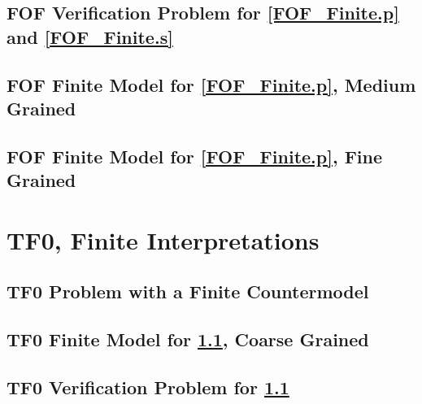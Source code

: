 \documentclass{easychair}
\begin{document}
\newpage
\subsection{FOF Verification Problem for \ref{FOF_Finite.p} and \ref{FOF_Finite.s}}
\label{FOF_Finite.s.p}
\begin{small}

\end{small}

\newpage
\subsection{FOF Finite Model for \ref{FOF_Finite.p}, Medium Grained}
\label{FOF_Finite_Medium.s}
\begin{small}

\end{small}

\newpage
\subsection{FOF Finite Model for \ref{FOF_Finite.p}, Fine Grained}
\label{FOF_Finite_Fine.s}
\begin{small}

\end{small}

\newpage
\section{TF0, Finite Interpretations}
\label{TF0Finite}

\subsection{TF0 Problem with a Finite Countermodel}
\label{TFF_Finite.p}
\begin{small}

\end{small}

\newpage
\subsection{TF0 Finite Model for \ref{TFF_Finite.p}, Coarse Grained}
\label{TFF_Finite.s}
\begin{small}

\end{small}

\newpage
\subsection{TF0 Verification Problem for \ref{TFF_Finite.p}}
\label{TFF_Finite.s.p}
\begin{small}

\end{small}
\end{document}
